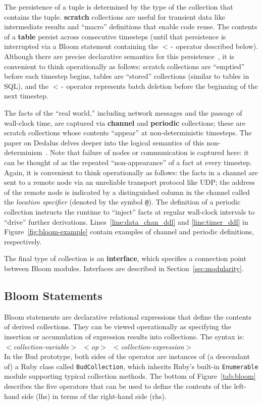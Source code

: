 The persistence of a tuple is determined by the type of the collection that
contains the tuple. \textbf{scratch} collections are useful for transient data
like intermediate results and ``macro'' definitions that enable code reuse. The
contents of a \textbf{table} persist across consecutive timesteps (until that
persistence is interrupted via a Bloom statement containing the \texttt{$<$-}
operator described below). Although there are precise declarative semantics for
this persistence~\cite{dedalus}, it is convenient to think operationally as
follows: scratch collections are ``emptied'' before each timestep begins, tables
are ``stored'' collections (similar to tables in SQL), and the \texttt{$<$-}
operator represents batch deletion before the beginning of the next timestep.

The facts of the ``real world,'' including network messages and the passage of
wall-clock time, are captured via \textbf{channel} and \textbf{periodic}
collections; these are scratch collections whose contents ``appear'' at
non-deterministic timesteps.  The paper on Dedalus delves deeper into the
logical semantics of this non-determinism~\cite{dedalus}. Note that failure of
nodes or communication is captured here: it can be thought of as the repeated
``non-appearance'' of a fact at every timestep.  Again, it is convenient to
think operationally as follows: the facts in a channel are sent to a remote node
via an unreliable transport protocol like UDP; the address of the remote node is
indicated by a distinguished column in the channel called the \emph{location
  specifier} (denoted by the symbol \texttt{@}). The definition of a periodic
collection instructs the runtime to ``inject'' facts at regular wall-clock
intervals to ``drive'' further derivations. Lines~\ref{line:data_chan_ddl} and
\ref{line:timer_ddl} in Figure~\ref{fig:bloom-example} contain examples of
channel and periodic definitions, respectively.

The final type of collection is an \textbf{interface}, which specifies a
connection point between Bloom modules. Interfaces are described in
Section~\ref{sec:modularity}.

\subsection{Bloom Statements}
Bloom statements are declarative relational expressions that define the contents
of derived collections.  They can be viewed operationally as specifying the insertion or accumulation of expression results into collections.  The syntax
is:\\ \noindent
\mbox{\hspace{0.25in}\emph{$<$collection-variable$>$ $<$op$>$
$<$collection-expression$>$}}\\ \noindent In the Bud prototype, both sides of
the operator are instances of (a descendant of) a Ruby class called
\texttt{BudCollection}, which inherits Ruby's built-in \texttt{Enumerable}
module supporting typical collection methods.  The bottom of Figure~\ref{tab:bloom} describes
the five operators that can be used to define the contents of the left-hand
side (lhs) in terms of the right-hand side (rhs).

